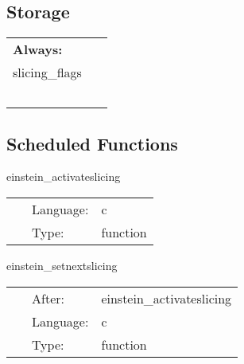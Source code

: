 \documentclass{article}
\begin{document}
\subsection*{Storage}

\hspace{5mm}

 \begin{tabular*}{160mm}{ll} 

{\bf Always:}&  ~ \\ 
 slicing\_flags & ~\\ 
~ & ~\\ 
\end{tabular*} 


\subsection*{Scheduled Functions}
\vspace{5mm}


\hspace{5mm} einstein\_activateslicing 

\hspace{5mm}{\it initialize slicing, setup priorities for mixed slicings } 


\hspace{5mm}

 \begin{tabular*}{160mm}{cll} 
~ & Language:  & c \\ 
~ & Type:  & function \\ 
\end{tabular*} 


\vspace{5mm}


\hspace{5mm} einstein\_setnextslicing 

\hspace{5mm}{\it identify the slicing for the next iteration } 


\hspace{5mm}

 \begin{tabular*}{160mm}{cll} 
~ & After:  & einstein\_activateslicing \\ 
~ & Language:  & c \\ 
~ & Type:  & function \\ 
\end{tabular*} 
\end{document}
